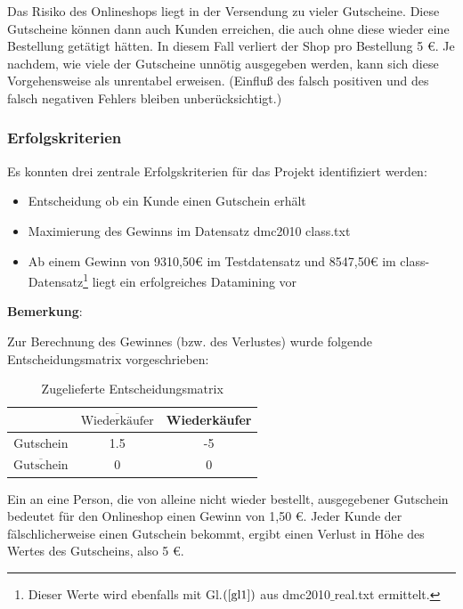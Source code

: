 \documentclass[a4paper,12pt]{article}
\begin{document}
Das Risiko des Onlineshops liegt in der Versendung zu vieler Gutscheine. Diese Gutscheine können dann auch Kunden erreichen, die auch ohne diese wieder eine Bestellung getätigt hätten. In diesem Fall verliert der Shop pro Bestellung 5 \euro. Je nachdem, wie viele der Gutscheine unnötig ausgegeben werden, kann
sich diese Vorgehensweise als unrentabel erweisen. (Einfluß des falsch positiven und des falsch negativen Fehlers bleiben unberücksichtigt.)

\subsubsection{Erfolgskriterien}
Es konnten drei zentrale Erfolgskriterien für das Projekt identifiziert werden:
\begin{itemize}
	\item Entscheidung ob ein Kunde einen Gutschein erhält
	\item Maximierung des Gewinns im Datensatz dmc2010 class.txt
	\item Ab einem Gewinn von 9310,50\euro\; im Testdatensatz und 8547,50\euro\; im class-Datensatz\footnote{Dieser Werte wird ebenfalls mit Gl.$(\ref{gl1})$  aus dmc2010$\_$real.txt ermittelt.} liegt ein erfolgreiches Datamining vor
\end{itemize}

\textbf{Bemerkung}:
\par
Zur Berechnung des Gewinnes (bzw. des Verlustes) wurde folgende Entscheidungsmatrix vorgeschrieben:

\begin{table}[h]
\begin{center}
\begin{tabular}{c | c | c }
 &$\overline{\text{Wiederkäufer}}$\footnotemark & Wiederkäufer
\\
\hline
Gutschein & 1.5 & -5
\\
$\overline{\text{Gutschein}}$ & 0 & 0
\end{tabular}
\caption{Zugelieferte Entscheidungsmatrix}
\end{center}
\end{table}
Ein an eine Person, die von alleine nicht wieder bestellt, ausgegebener Gutschein bedeutet für den Onlineshop einen Gewinn von 1,50 \euro\;. Jeder Kunde der fälschlicherweise
einen Gutschein bekommt, ergibt einen Verlust in  Höhe des Wertes des Gutscheins, also 5 \euro.
\end{document}
